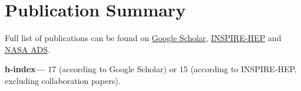 \newcommand{\arxiv}[1]{[\href{http://arxiv.org/abs/#1}{arXiv:#1}]}
\def\zero{0}
\def\one{1}
\newcommand{\citeCount}[1]{%
    \def\val{#1}
    \ifx\val\zero%
    \else%
        \ifx\val\one%
        (1~citation)%
        \else%
        (#1~citations)%
        \fi%
    \fi
}


\def\advisedStudent{$^\bigstar$}

\def\fgittins{\textbf{Gittins, F.}}


\makeatletter
{}
\makeatother
\setcounter{pubCounter}{\numexpr\value{numPubs}+1\relax}

\newenvironment{publist}{%
    \addtocounter{pubCounter}{-1}%
    \begin{etaremune}[start=\value{pubCounter}]%
    \renewcommand\labelenumi{[\theenumi]}%
}{%
    \setcounter{pubCounter}{\value{enumi}}%
    \addtocounter{pubTotal}{\value{EM@itemctr}}%
    \end{etaremune}%
}

\newif\ifshowpubsummary
\showpubsummarytrue
\ifshowpubsummary
\section{Publication Summary}

Full list of publications can be found on
\href{https://scholar.google.com/citations?hl=en&user=jET8KxgAAAAJ}%
{Google Scholar},
\href{https://inspirehep.net/authors/1798261}%
{INSPIRE-HEP}
and
\href{https://ui.adsabs.harvard.edu/user/libraries/SDMGXaKoRomaOJsefpo2yQ}%
{NASA ADS}.

\textbf{h-index---}%
17 (according to Google Scholar) or 15 (according to INSPIRE-HEP, excluding collaboration papers).

